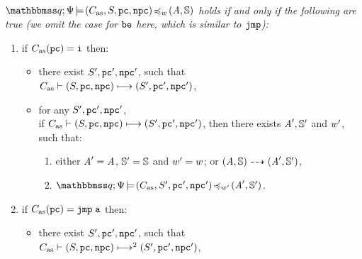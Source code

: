 \begin{definition}
    \label{def:siminsseq}
    \em
    \mbox{} \\
    $\simInsSeq{\relastQ}{\Cspec}{(\asmimp, \state, \pc, \npc)}
        {\word}{(\primcom, \hpstate)}$ holds if and only if 
    the following are true 
    (we omit the case
    for $\be$ here, which is similar to $\jmp$):
    
    \small
    \begin{enumerate}[1.]
		\item if $\asmimp(\pc) = \simplins$ then:
		\begin{itemize}
			\item
			there exist $\state', \pc', \npc'$, such that \\
			$\lptrans{\asmimp}{(\state, \pc, \npc)}{(\state', \pc', \npc')}$,
			
			\item
			for any $\state', \pc', \npc'$, \\ if
            $\lptrans{\asmimp}{(\state, \pc, \npc)}{(\state', \pc', \npc')}$, then 
            there exists $\primcom', \hpstate'$ and $\word'$, such that: 
            \begin{enumerate}[(1)]
                \item either $\primcom' = \primcom$, 
                    $\hpstate' = \hpstate$ and $\word' = \word$; 
                    or 
                    $\primTrans{(\primcom, \hpstate)}
                        {(\primcom', \hpstate')}$, 
                \item $\simInsSeq{\relastQ}{\Cspec}
                    {(\asmimp, \state', \pc', \npc')}{\word'}
                    {(\primcom', \hpstate')}$.  
            \end{enumerate} 
        \end{itemize}

        \item if $\asmimp(\pc) = \jmp \; \aexp$ then:
            \begin{itemize}
                \item there exist $\state', \pc', \npc'$, such that
                \\
                $\multilptrans{\asmimp}{2}{(\state, \pc, \npc)}
                    {(\state', \pc', \npc')}$,
                

\end{itemize}
\end{enumerate}
\end{definition}
